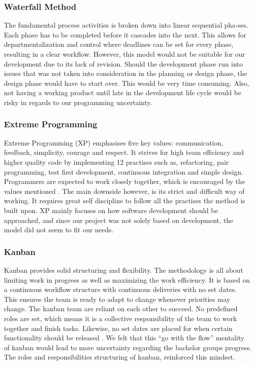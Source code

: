 \subsubsection*{Waterfall Method}
The fundamental process activities is broken down into linear sequential pha-ses\cite{WaterfallMethod}. Each phase has to be completed before it cascades into the next. This allows for departmentalization and control where deadlines can be set for every phase, resulting in a clear workflow. However, this model would not be suitable for our development due to its lack of revision. Should the development phase run into issues that was not taken into consideration in the planning or design phase, the design phase would have to start over. This would be very time consuming. Also, not having a working product until late in the development life cycle would be risky in regards to our programming uncertainty.   

\subsubsection*{Extreme Programming}
Extreme Programming (XP) emphasises five key values: communication, feedback, simplicity, courage and respect. It strives for high team efficiency and higher quality code by implementing 12 practises such as, refactoring, pair programming, test first development, continuous integration and simple design. Programmers are expected to work closely together, which is encouraged by the values mentioned \cite{eXtremeP}. The main downside however, is its strict and difficult way of working. It requires great self discipline to follow all the practises the method is built upon. XP mainly focuses on how software development should be approached, and since our project was not solely based on development, the model did not seem to fit our needs.  
\newpage

\subsubsection*{Kanban}
Kanban provides solid structuring and flexibility. The methodology is all about limiting work in progress as well as maximizing the work efficiency. It is based on a continuous workflow structure with continuous deliveries with no set dates. This ensures the team is ready to adapt to change whenever priorities may change. The kanban team are reliant on each other to succeed. No predefined roles are set, which means it is a collective responsibility of the team to work together and finish tasks. Likewise, no set dates are placed for when certain functionality should be released \cite{kanban}. We felt that this ``go with the flow'' mentality of kanban would lead to more uncertainty regarding the bachelor groups progress. The roles and responsibilities structuring of kanban, reinforced this mindset.  

